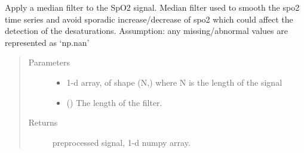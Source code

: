 \documentclass[letterpaper,10pt,english]{sphinxmanual}
\begin{document}
\begin{fulllineitems}
\label{\detokenize{OBM:OBM.Preprocessing.median_spo2}}
Apply a median filter to the SpO2 signal.
Median filter used to smooth the spo2 time series and avoid sporadic increase/decrease of spo2 which could 
affect the detection of the desaturations.
Assumption: any missing/abnormal values are represented as ‘np.nan’
\begin{quote}\begin{description}
\item[{Parameters}] \leavevmode\begin{itemize}
\item {} 
 \textendash{} 1-d array, of shape (N,) where N is the length of the signal

\item {} 
\sphinxstyleliteralstrong{\sphinxupquote{(}}\sphinxstyleliteralstrong{\sphinxupquote{)}} () \textendash{} The length of the filter.

\end{itemize}

\item[{Returns}] \leavevmode
preprocessed signal, 1-d numpy array.

\end{description}\end{quote}

\end{fulllineitems}

\end{document}
